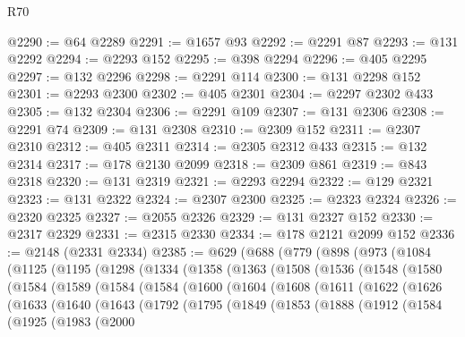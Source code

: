 \begin{lexlean}{R70}
\begin{coremodule}
@2290 := @64 @2289
@2291 := @1657 @93
@2292 := @2291 @87
@2293 := @131 @2292
@2294 := @2293 @152
@2295 := @398 @2294
@2296 := @405 @2295
@2297 := @132 @2296
@2298 := @2291 @114
@2300 := @131 @2298 @152
@2301 := @2293 @2300
@2302 := @405 @2301
@2304 := @2297 @2302 @433
@2305 := @132 @2304
@2306 := @2291 @109
@2307 := @131 @2306
@2308 := @2291 @74
@2309 := @131 @2308
@2310 := @2309 @152
@2311 := @2307 @2310
@2312 := @405 @2311
@2314 := @2305 @2312 @433
@2315 := @132 @2314
@2317 := @178 @2130 @2099
@2318 := @2309 @861
@2319 := @843 @2318
@2320 := @131 @2319
@2321 := @2293 @2294
@2322 := @129 @2321
@2323 := @131 @2322
@2324 := @2307 @2300
@2325 := @2323 @2324
@2326 := @2320 @2325
@2327 := @2055 @2326
@2329 := @131 @2327 @152
@2330 := @2317 @2329
@2331 := @2315 @2330
@2334 := @178 @2121 @2099 @152
@2336 := @2148 (@2331 @2334)
@2385 := @629
    (@688
      (@779
        (@898
          (@973
            (@1084
              (@1125
                (@1195
                  (@1298
                    (@1334
                      (@1358
                        (@1363
                          (@1508
                            (@1536
                              (@1548
                                (@1580
                                  (@1584
                                    (@1589
                                      (@1584
                                        (@1584
                                          (@1600
                                            (@1604
                                              (@1608
                                                (@1611
                                                  (@1622
                                                    (@1626
                                                      (@1633
                                                        (@1640
                                                          (@1643
                                                            (@1792
                                                              (@1795
                                                                (@1849
                                                                  (@1853
                                                                    (@1888
                                                                      (@1912
                                                                        (@1584
                                                                          (@1925
                                                                            (@1983
                                                                              (@2000

\end{coremodule}
\end{lexlean}
